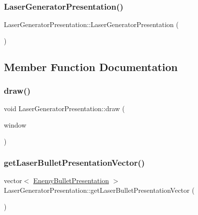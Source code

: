 \subsubsection{\texorpdfstring{Laser\+Generator\+Presentation()}{LaserGeneratorPresentation()}}
{\footnotesize\ttfamily Laser\+Generator\+Presentation\+::\+Laser\+Generator\+Presentation (\begin{DoxyParamCaption}{ }\end{DoxyParamCaption})}



\subsection{Member Function Documentation}
\mbox{\label{class_laser_generator_presentation_a44a7cafde213e243cd0c6bf6f228d62c}} 
\subsubsection{\texorpdfstring{draw()}{draw()}}
{\footnotesize\ttfamily void Laser\+Generator\+Presentation\+::draw (\begin{DoxyParamCaption}\item[{Render\+Window \&}]{window }\end{DoxyParamCaption})}

\mbox{\label{class_laser_generator_presentation_a96fd1b356d6d9558f2bf78f5bbe9f9a5}} 
\subsubsection{\texorpdfstring{get\+Laser\+Bullet\+Presentation\+Vector()}{getLaserBulletPresentationVector()}}
{\footnotesize\ttfamily vector$<$ \hyperlink{class_enemy_bullet_presentation}{Enemy\+Bullet\+Presentation} $>$ Laser\+Generator\+Presentation\+::get\+Laser\+Bullet\+Presentation\+Vector (\begin{DoxyParamCaption}{ }\end{DoxyParamCaption})}

